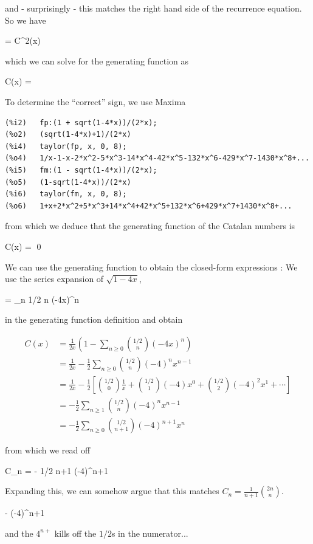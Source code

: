 and - surprisingly - this matches the right hand side of the recurrence equation. So we have

\bee
{} = C^2(x)
\eee

which we can solve for the generating function as

\bee
C(x) = 
\eee

To determine the ``correct'' sign, we use Maxima

\begin{verbatim}
(%i2)	fp:(1 + sqrt(1-4*x))/(2*x);
(%o2)	(sqrt(1-4*x)+1)/(2*x)
(%i4)	taylor(fp, x, 0, 8);
(%o4)	1/x-1-x-2*x^2-5*x^3-14*x^4-42*x^5-132*x^6-429*x^7-1430*x^8+...
(%i5)	fm:(1 - sqrt(1-4*x))/(2*x);
(%o5)	(1-sqrt(1-4*x))/(2*x)
(%i6)	taylor(fm, x, 0, 8);
(%o6)	1+x+2*x^2+5*x^3+14*x^4+42*x^5+132*x^6+429*x^7+1430*x^8+...
\end{verbatim}

from which we deduce that the generating function of the Catalan numbers is

\bee
C(x) =  \qed
\eee

We can use the generating function to obtain the closed-form expressions \label{2022-06-15:eq2}: We use the series expansion of $\sqrt{1-4x}$,

\bee
{} = \sum_{n } {1/2 \choose n} (-4x)^n
\eee

in the generating function definition and obtain

\begin{align*}
  C(x) &= \frac{1}{2x} \left( 1 - \sum_{n \geq 0} {1/2 \choose n} (-4x)^n \right) \\
       &= \frac{1}{2x} - \frac{1}{2} \sum_{n \geq 0} {1/2 \choose n} (-4)^n x^{n-1} \\
       &= \frac{1}{2x} - \frac{1}{2} \left[ {1/2 \choose 0} \frac{1}{x} + {1/2 \choose 1} (-4)x^0 + {1/2 \choose 2} (-4)^2 x^1 + \cdots \right] \\
       &= -\frac{1}{2} \sum_{n \geq 1} {1/2 \choose n} (-4)^n x^{n-1} \\
       &= - \frac{1}{2} \sum_{n \geq 0} {1/2 \choose n+1} (-4)^{n+1} x^{n}
\end{align*}

from which we read off

\bee
C_n = -  {1/2 \choose n+1} (-4)^{n+1}
\eee

Expanding this, we can somehow argue that this matches $C_n = \frac{1}{n+1} {2n \choose n}$. 

\bee
 -   (-4)^{n+1} 
 \eee

 and the $4^{n+}$ kills off the $1/2$s in the numerator...

